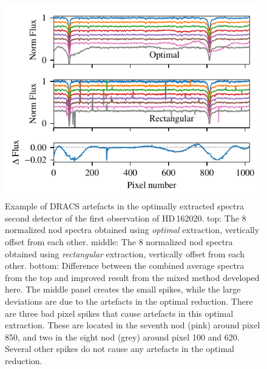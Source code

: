 \begin{figure}
    \centering
    \includegraphics[width=0.7\linewidth]{figures/reduction/bp_plots/extraction_comparision_HD162020-1_chip_2.pdf}
    \caption{Example of {DRACS} artefacts in the optimally extracted spectra second detector of the first observation of {HD\,162020}.
        top: The 8 normalized nod spectra obtained using \emph{optimal} extraction, vertically offset from each other.
        middle: The 8 normalized nod spectra obtained using \emph{rectangular} extraction, vertically offset from each other.
        bottom: Difference between the combined average spectra from the top and improved result from the mixed method developed here.
        The middle panel creates the small spikes, while the large deviations are due to the artefacts in the optimal reduction.
        There are three bad pixel spikes that cause artefacts in this optimal extraction.
        These are located in the seventh nod (pink) around pixel 850, and two in the eight nod (grey) around pixel 100 and 620.
        Several other spikes do not cause any artefacts in the optimal reduction.}
    \label{fig:artefact_example_hd162020}
\end{figure}


